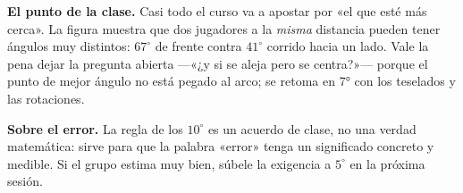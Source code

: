 \documentclass[11pt]{article}
\begin{document}
\begin{nota}
\textbf{El punto de la clase.} Casi todo el curso va a apostar por «el que esté más cerca».
La figura muestra que dos jugadores a la \emph{misma} distancia pueden tener ángulos muy
distintos: $67^\circ$ de frente contra $41^\circ$ corrido hacia un lado. Vale la pena dejar
la pregunta abierta —«¿y si se aleja pero se centra?»— porque el punto de mejor ángulo no
está pegado al arco; se retoma en 7° con los teselados y las rotaciones.
\end{nota}

\begin{nota}
\textbf{Sobre el error.} La regla de los $10^\circ$ es un acuerdo de clase, no una verdad
matemática: sirve para que la palabra «error» tenga un significado concreto y medible. Si el
grupo estima muy bien, súbele la exigencia a $5^\circ$ en la próxima sesión.
\end{nota}
\end{document}
